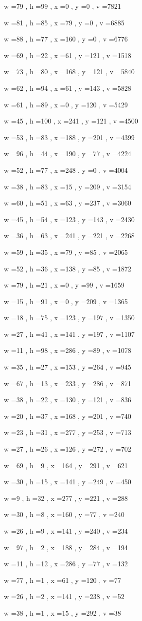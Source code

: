 \documentclass[11pt]{article}
\begin{document}
w =79 , h =99 , x =0 , y =0 , v =7821
\par
w =81 , h =85 , x =79 , y =0 , v =6885
\par
w =88 , h =77 , x =160 , y =0 , v =6776
\par
w =69 , h =22 , x =61 , y =121 , v =1518
\par
w =73 , h =80 , x =168 , y =121 , v =5840
\par
w =62 , h =94 , x =61 , y =143 , v =5828
\par
w =61 , h =89 , x =0 , y =120 , v =5429
\par
w =45 , h =100 , x =241 , y =121 , v =4500
\par
w =53 , h =83 , x =188 , y =201 , v =4399
\par
w =96 , h =44 , x =190 , y =77 , v =4224
\par
w =52 , h =77 , x =248 , y =0 , v =4004
\par
w =38 , h =83 , x =15 , y =209 , v =3154
\par
w =60 , h =51 , x =63 , y =237 , v =3060
\par
w =45 , h =54 , x =123 , y =143 , v =2430
\par
w =36 , h =63 , x =241 , y =221 , v =2268
\par
w =59 , h =35 , x =79 , y =85 , v =2065
\par
w =52 , h =36 , x =138 , y =85 , v =1872
\par
w =79 , h =21 , x =0 , y =99 , v =1659
\par
w =15 , h =91 , x =0 , y =209 , v =1365
\par
w =18 , h =75 , x =123 , y =197 , v =1350
\par
w =27 , h =41 , x =141 , y =197 , v =1107
\par
w =11 , h =98 , x =286 , y =89 , v =1078
\par
w =35 , h =27 , x =153 , y =264 , v =945
\par
w =67 , h =13 , x =233 , y =286 , v =871
\par
w =38 , h =22 , x =130 , y =121 , v =836
\par
w =20 , h =37 , x =168 , y =201 , v =740
\par
w =23 , h =31 , x =277 , y =253 , v =713
\par
w =27 , h =26 , x =126 , y =272 , v =702
\par
w =69 , h =9 , x =164 , y =291 , v =621
\par
w =30 , h =15 , x =141 , y =249 , v =450
\par
w =9 , h =32 , x =277 , y =221 , v =288
\par
w =30 , h =8 , x =160 , y =77 , v =240
\par
w =26 , h =9 , x =141 , y =240 , v =234
\par
w =97 , h =2 , x =188 , y =284 , v =194
\par
w =11 , h =12 , x =286 , y =77 , v =132
\par
w =77 , h =1 , x =61 , y =120 , v =77
\par
w =26 , h =2 , x =141 , y =238 , v =52
\par
w =38 , h =1 , x =15 , y =292 , v =38
\par
\newpage
\end{document}
